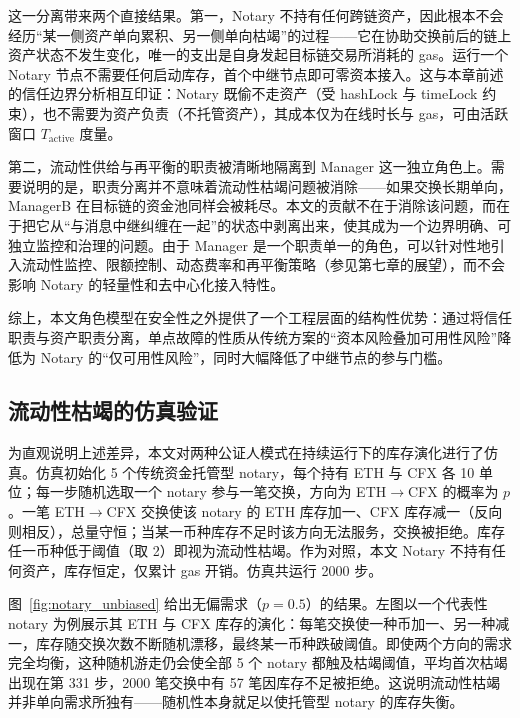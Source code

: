 这一分离带来两个直接结果。第一，Notary 不持有任何跨链资产，因此根本不会经历\textquotedblleft 某一侧资产单向累积、另一侧单向枯竭\textquotedblright 的过程——它在协助交换前后的链上资产状态不发生变化，唯一的支出是自身发起目标链交易所消耗的 gas。运行一个 Notary 节点不需要任何启动库存，首个中继节点即可零资本接入。这与本章前述的信任边界分析相互印证：Notary 既偷不走资产（受 hashLock 与 timeLock 约束），也不需要为资产负责（不托管资产），其成本仅为在线时长与 gas，可由活跃窗口 $T_{\text{active}}$ 度量。

第二，流动性供给与再平衡的职责被清晰地隔离到 Manager 这一独立角色上。需要说明的是，职责分离并不意味着流动性枯竭问题被消除——如果交换长期单向，ManagerB 在目标链的资金池同样会被耗尽。本文的贡献不在于消除该问题，而在于把它从\textquotedblleft 与消息中继纠缠在一起\textquotedblright 的状态中剥离出来，使其成为一个边界明确、可独立监控和治理的问题。由于 Manager 是一个职责单一的角色，可以针对性地引入流动性监控、限额控制、动态费率和再平衡策略（参见第七章的展望），而不会影响 Notary 的轻量性和去中心化接入特性。

综上，本文角色模型在安全性之外提供了一个工程层面的结构性优势：通过将信任职责与资产职责分离，单点故障的性质从传统方案的\textquotedblleft 资本风险叠加可用性风险\textquotedblright 降低为 Notary 的\textquotedblleft 仅可用性风险\textquotedblright，同时大幅降低了中继节点的参与门槛。

\subsection{流动性枯竭的仿真验证}


为直观说明上述差异，本文对两种公证人模式在持续运行下的库存演化进行了仿真。仿真初始化 5 个传统资金托管型 notary，每个持有 ETH 与 CFX 各 10 单位；每一步随机选取一个 notary 参与一笔交换，方向为 ETH$\rightarrow$CFX 的概率为 $p$。一笔 ETH$\rightarrow$CFX 交换使该 notary 的 ETH 库存加一、CFX 库存减一（反向则相反），总量守恒；当某一币种库存不足时该方向无法服务，交换被拒绝。库存任一币种低于阈值（取 2）即视为流动性枯竭。作为对照，本文 Notary 不持有任何资产，库存恒定，仅累计 gas 开销。仿真共运行 2000 步。

图~\ref{fig:notary_unbiased} 给出无偏需求（$p=0.5$）的结果。左图以一个代表性 notary 为例展示其 ETH 与 CFX 库存的演化：每笔交换使一种币加一、另一种减一，库存随交换次数不断随机漂移，最终某一币种跌破阈值。即使两个方向的需求完全均衡，这种随机游走仍会使全部 5 个 notary 都触及枯竭阈值，平均首次枯竭出现在第 331 步，2000 笔交换中有 57 笔因库存不足被拒绝。这说明流动性枯竭并非单向需求所独有——随机性本身就足以使托管型 notary 的库存失衡。

